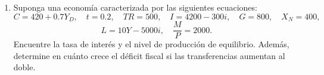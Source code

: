 \documentclass[11pt,addpoints]{article}
\begin{document}
\begin{enumerate}
\begin{enumerate}[label=\arabic*.]
\item Suponga una economía caracterizada por las siguientes ecuaciones:
\[
C = 420 + 0.7Y_D, \quad t = 0.2, \quad TR = 500, \quad I = 4200 - 300i, \quad G = 800, \quad X_N = 400,
\]
\[
L = 10Y - 5000i, \quad \frac{M}{P} = 2000.
\]
Encuentre la tasa de interés y el nivel de producción de equilibrio. Además, determine en cuánto crece el déficit fiscal si las transferencias aumentan al doble.  
\end{enumerate}

\end{enumerate}
\end{document}
